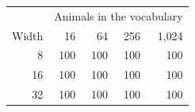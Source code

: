 \begin{tabular}{@{}rrrrr@{}}
\toprule
 & \multicolumn{4}{c}{Animals in the vocabulary} \\
Width & 16 & 64 & 256 & 1{,}024 \\
\midrule
8 & 100 & 100 & 100 & 100 \\
16 & 100 & 100 & 100 & 100 \\
32 & 100 & 100 & 100 & 100 \\
\bottomrule
\end{tabular}

